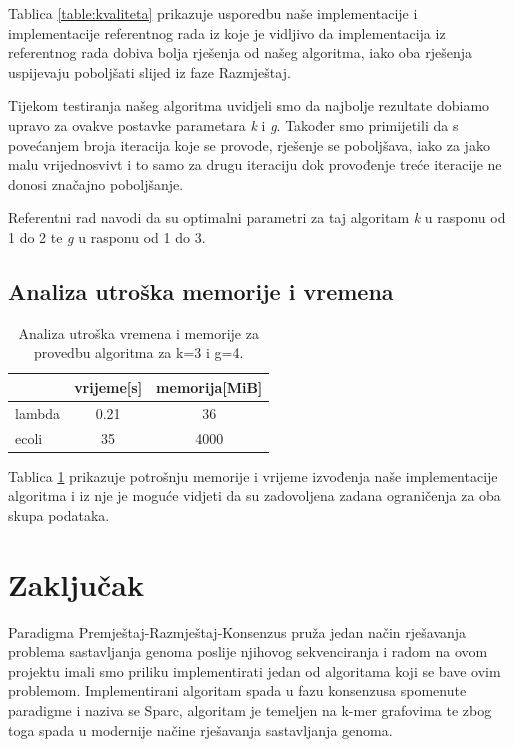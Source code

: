\documentclass[times, utf8, seminar, numeric]{fer}
\begin{document}
Tablica \ref{table:kvaliteta} prikazuje usporedbu naše implementacije i implementacije referentnog rada iz koje je vidljivo da implementacija iz referentnog rada dobiva bolja rješenja od našeg algoritma, iako oba rješenja uspijevaju poboljšati slijed iz faze Razmještaj.

Tijekom testiranja našeg algoritma uvidjeli smo da najbolje rezultate dobiamo upravo za ovakve postavke parametara \emph{k} i \emph{g}. Također smo primijetili da s povećanjem broja iteracija koje se provode, rješenje se poboljšava, iako za jako malu vrijednosvivt i to samo za drugu iteraciju dok provođenje treće iteracije ne donosi značajno poboljšanje.

Referentni rad navodi da su optimalni parametri za taj algoritam \emph{k} u rasponu od 1 do 2 te \emph{g} u rasponu od 1 do 3. 

\section{Analiza utroška memorije i vremena}
\begin{table}[htb]
	\centering
	\begin{tabular}{l|cc}
		& \multicolumn{1}{l}{vrijeme[s]} & memorija[MiB] \\ 	\hline
		lambda			& 0.21		& 36 	\\ 	\hline
		ecoli  			& 35     & 4000  \\	\hline
	\end{tabular}
	\caption{Analiza utroška vremena i memorije za provedbu algoritma za k=3 i g=4.}
	\label{table:memorija}
\end{table}

Tablica \ref{table:memorija} prikazuje potrošnju memorije i vrijeme izvođenja naše implementacije algoritma i iz nje je moguće vidjeti da su zadovoljena zadana ograničenja za oba skupa podataka. 


\chapter{Zaključak}
Paradigma Premještaj-Razmještaj-Konsenzus pruža jedan način rješavanja problema sastavljanja genoma poslije njihovog sekvenciranja i radom na ovom projektu imali smo priliku implementirati jedan od algoritama koji se bave ovim problemom. Implementirani algoritam spada u fazu konsenzusa spomenute paradigme i naziva se Sparc, algoritam je temeljen na k-mer grafovima te zbog toga spada u modernije načine rješavanja sastavljanja genoma.
\end{document}
